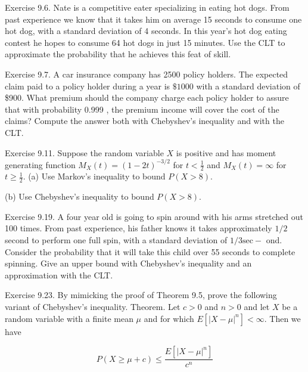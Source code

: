 \documentclass[10pt]{article}
\begin{document}
\hfill \break
Exercise 9.6. Nate is a competitive eater specializing in eating hot dogs. From past experience we know that it takes him on average 15 seconds to consume one hot dog, with a standard deviation of 4 seconds. In this year's hot dog eating contest he hopes to consume 64 hot dogs in just 15 minutes. Use the CLT to approximate the probability that he achieves this feat of skill.

\hfill \break
Exercise 9.7. A car insurance company has 2500 policy holders. The expected claim paid to a policy holder during a year is $\$ 1000$ with a standard deviation of \$900. What premium should the company charge each policy holder to assure that with probability 0.999 , the premium income will cover the cost of the claims? Compute the answer both with Chebyshev's inequality and with the CLT.

\hfill \break
Exercise 9.11. Suppose the random variable $X$ is positive and has moment generating function $M_{X}(t)=(1-2 t)^{-3 / 2}$ for $t<\frac{1}{2}$ and $M_{X}(t)=\infty$ for $t \geq \frac{1}{2}$. (a) Use Markov's inequality to bound $P(X>8)$.

(b) Use Chebyshev's inequality to bound $P(X>8)$.

\hfill \break
Exercise 9.19. A four year old is going to spin around with his arms stretched out 100 times. From past experience, his father knows it takes approximately $1 / 2$ second to perform one full spin, with a standard deviation of $1 / 3 \mathrm{sec}-$ ond. Consider the probability that it will take this child over 55 seconds to complete spinning. Give an upper bound with Chebyshev's inequality and an approximation with the CLT.

\hfill \break
Exercise 9.23. By mimicking the proof of Theorem 9.5, prove the following variant of Chebyshev's inequality. Theorem. Let $c>0$ and $n>0$ and let $X$ be a random variable with a finite mean $\mu$ and for which $E\left[|X-\mu|^{n}\right]<\infty$. Then we have

$$
P(X \geq \mu+c) \leq \frac{E\left[|X-\mu|^{n}\right]}{c^{n}}
$$
\end{document}
